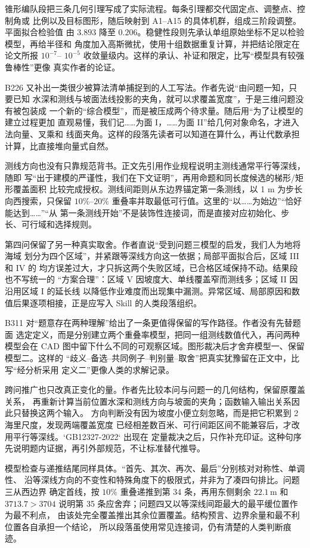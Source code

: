 锥形编队段把三条几何引理写成了实际流程。每条引理都交代固定点、调整点、控制角或
比例以及目标图形，随后映射到 A1--A15 的具体机群，组成三阶段调整。平面拟合检验值
由 $3.893$ 降至 $0.206$。稳健性段则先承认单组原始坐标不足以检验模型，再给半径和
角度加入高斯微扰，使用十组数据重复计算，并把结论限定在论文所报 $10^{-7}$--
$10^{-5}$ 收敛量级内。这样的承认、补证和限定，比写“模型具有较强鲁棒性”更像
真实作者的论证。

B226 又补出一类很少被算法清单捕捉到的人工写法。作者先说“由问题一知，只要已知
水深和测线与坡面法线投影的夹角，就可以求覆盖宽度”，于是三维问题没有被包装成
一个新的“综合模型”，而是被压成两个待求量。随后用“为了让模型的建立过程更加
直观易懂，我们记……为面 I，……为面 II”给几何对象命名，才进入法向量、叉乘和
线面夹角。这样的段落先读者可以知道在算什么，再让代数承担计算，比直接堆向量式自然。

测线方向也没有只靠规范背书。正文先引用作业规程说明主测线通常平行等深线，随即
写“出于建模的严谨性，我们在下文证明”，再用命题和同长度候选的梯形/矩形覆盖面积
比较完成授权。测线间距则从东边界锚定第一条测线，以 1 m 为步长向西搜索，只保留
$10\%$--$20\%$ 重叠率并取最低可行值。这里的“以……为始边”“恰好能达到……”“从
第一条测线开始”不是装饰性连接词，而是直接对应初始化、步长、可行域和选择规则。

第四问保留了另一种真实取舍。作者直说“受到问题三模型的启发，我们人为地将海域
划分为四个区域”，并紧跟等深线方向这一依据；局部平面拟合后，区域 III 和 IV 的
均方误差过大，才只拆这两个失败区域，已合格区域保持不动。结果段也不写统一的
“方案合理”：区域 V 因坡度大、单线覆盖窄而测线多；区域 II 因沿用区域 I 的延长线
以降低作业难度而出现集中漏测。异常区域、局部原因和数值后果逐项相接，正是应写入
Skill 的人类段落组织。

B311 对“题意存在两种理解”给出了一条更值得保留的写作路径。作者没有先替题面
选定定义，而是分别建立两个重叠率模型，把同一组测线数值代入，再问两种模型会在
CAD 图中留下什么不同的可观察区域。图形裁决后才舍弃模型一、保留模型二。这样的
“歧义--备选--共同例子--判别量--取舍”把真实犹豫留在正文中，比写“经分析采用
定义二”更像人类的求解记录。

跨问推广也只改真正变化的量。作者先比较本问与问题一的几何结构，保留原覆盖关系，
再重新计算当前位置水深和测线方向与坡面的夹角；函数输入输出关系因此只替换这两个输入。
方向判断没有因为坡度小便立刻忽略，而是把它积累到 2 海里尺度，发现两端覆盖宽度
已经相差数百米、可行间距区间不能兼容后，才改用平行等深线。`GB12327-2022` 出现在
定量裁决之后，只作补充印证。这种句序先说明题内证据，再引外部规范，不让标准替代推导。

模型检查与递推结尾同样具体。“首先、其次、再次、最后”分别核对对称性、单调性、
沿等深线方向的不变性和特殊角度下的极限式，并非为了凑四句排比。问题三从西边界
确定首线，按 $10\%$ 重叠递推到第 34 条，再用东侧剩余 $22.1\,\mathrm{m}$ 和
$3713.7>3704$ 说明第 35 条应舍弃；问题四又以等深线间距最大的最平缓位置作为最不利点，
由该处完全覆盖推出其余位置覆盖。结构预言、边界余量和最不利位置各自承担一个结论，
所以段落虽使用常见连接词，仍有清楚的人类判断痕迹。

